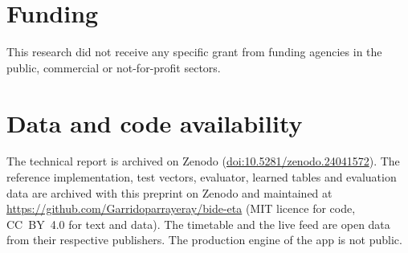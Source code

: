 \documentclass[preprint,11pt,nonatbib]{elsarticle}
\begin{document}
\section*{Funding}
This research did not receive any specific grant from funding agencies in the public, commercial or not-for-profit
sectors.

\section*{Data and code availability}
The technical report is archived on Zenodo (\href{https://doi.org/10.5281/zenodo.24041572}{doi:10.5281/zenodo.24041572}).
The reference implementation, test vectors, evaluator, learned tables and evaluation data are archived with this preprint
on Zenodo and maintained at \url{https://github.com/Garridoparrayeray/bide-eta} (MIT licence for code, CC~BY~4.0 for
text and data).
The timetable and the live feed are open data from their respective publishers. The production engine of the app is
not public.

\printbibliography

\appendix
\setcounter{table}{0}

\end{document}
